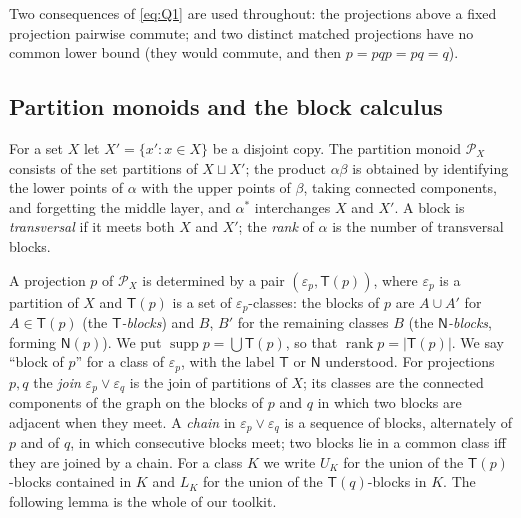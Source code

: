 \documentclass[11pt]{amsart}
\theoremstyle{definition}
\renewcommand{\P}{\mathcal{P}}      %
\newcommand{\supp}{\operatorname{supp}}
\newcommand{\T}{\mathsf{T}}
\newcommand{\N}{\mathsf{N}}
\newcommand{\rk}{\operatorname{rank}}
\begin{document}
Two consequences of \eqref{eq:Q1} are used throughout: the projections above a fixed projection pairwise commute; and two distinct matched projections have no common lower bound (they would commute, and then $p=pqp=pq=q$).

\subsection{Partition monoids and the block calculus}\label{subsec:PX}

For a set $X$ let $X'=\{x':x\in X\}$ be a disjoint copy. The partition monoid $\P_X$ consists of the set partitions of $X\sqcup X'$; the product $\alpha\beta$ is obtained by identifying the lower points of $\alpha$ with the upper points of $\beta$, taking connected components, and forgetting the middle layer, and $\alpha^*$ interchanges $X$ and $X'$. A block is \emph{transversal} if it meets both $X$ and $X'$; the \emph{rank} of $\alpha$ is the number of transversal blocks.

A projection $p$ of $\P_X$ is determined by a pair $(\varepsilon_p,\T(p))$, where $\varepsilon_p$ is a partition of $X$ and $\T(p)$ is a set of $\varepsilon_p$-classes: the blocks of $p$ are $A\cup A'$ for $A\in\T(p)$ (the \emph{$\T$-blocks}) and $B$, $B'$ for the remaining classes $B$ (the \emph{$\N$-blocks}, forming $\N(p)$). We put $\supp p=\bigcup\T(p)$, so that $\rk p=|\T(p)|$. We say ``block of $p$'' for a class of $\varepsilon_p$, with the label $\T$ or $\N$ understood. For projections $p,q$ the \emph{join} $\varepsilon_p\vee\varepsilon_q$ is the join of partitions of $X$; its classes are the connected components of the graph on the blocks of $p$ and $q$ in which two blocks are adjacent when they meet. A \emph{chain} in $\varepsilon_p\vee\varepsilon_q$ is a sequence of blocks, alternately of $p$ and of $q$, in which consecutive blocks meet; two blocks lie in a common class iff they are joined by a chain. For a class $K$ we write $U_K$ for the union of the $\T(p)$-blocks contained in $K$ and $L_K$ for the union of the $\T(q)$-blocks in $K$. The following lemma is the whole of our toolkit.
\end{document}
